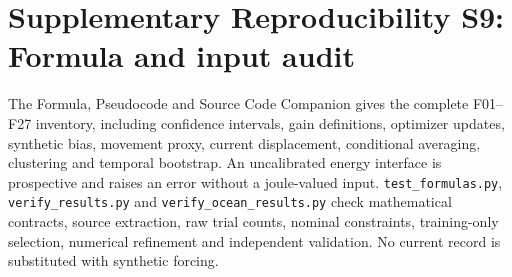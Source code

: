 \documentclass[10pt]{article}
\begin{document}
\section*{Supplementary Reproducibility S9: Formula and input audit}
The Formula, Pseudocode and Source Code Companion gives the complete F01--F27 inventory, including confidence intervals, gain definitions, optimizer updates, synthetic bias, movement proxy, current displacement, conditional averaging, clustering and temporal bootstrap. An uncalibrated energy interface is prospective and raises an error without a joule-valued input. \texttt{test\_formulas.py}, \texttt{verify\_results.py} and \texttt{verify\_ocean\_results.py} check mathematical contracts, source extraction, raw trial counts, nominal constraints, training-only selection, numerical refinement and independent validation. No current record is substituted with synthetic forcing.
\end{document}
